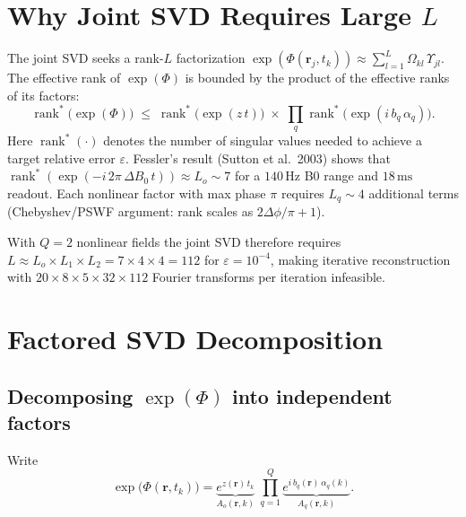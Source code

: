\documentclass{article}
\begin{document}
\section{Why Joint SVD Requires Large $L$}

The joint SVD seeks a rank-$L$ factorization
$\exp(\Phi(\mathbf{r}_j, t_k)) \approx \sum_{l=1}^L \Omega_{kl}\,\Upsilon_{jl}$.
The effective rank of $\exp(\Phi)$ is bounded by the product of the effective ranks
of its factors:
\begin{equation}
    \operatorname{rank}^*\bigl(\exp(\Phi)\bigr)
    \;\leq\; \operatorname{rank}^*\bigl(\exp(z\,t)\bigr) \;\times\;
    \prod_q \operatorname{rank}^*\bigl(\exp(i\,b_q\,\alpha_q)\bigr).
\end{equation}
Here $\operatorname{rank}^*(\cdot)$ denotes the number of singular values needed
to achieve a target relative error $\varepsilon$.
Fessler's result (Sutton et al.\ 2003) shows that $\operatorname{rank}^*(\exp(-i\,2\pi\,\Delta B_0\,t)) \approx L_o \sim 7$
for a $140\,\text{Hz}$ B0 range and $18\,\text{ms}$ readout.
Each nonlinear factor with max phase $\pi$ requires $L_q \sim 4$ additional terms
(Chebyshev/PSWF argument: rank scales as $2\Delta\phi/\pi + 1$).

With $Q=2$ nonlinear fields the joint SVD therefore requires
$L \approx L_o \times L_1 \times L_2 = 7 \times 4 \times 4 = 112$ for
$\varepsilon = 10^{-4}$, making iterative reconstruction with $20 \times 8 \times 5 \times 32 \times 112$
Fourier transforms per iteration infeasible.

\section{Factored SVD Decomposition}

\subsection{Decomposing $\exp(\Phi)$ into independent factors}

Write
\begin{equation}
    \exp\bigl(\Phi(\mathbf{r}, t_k)\bigr)
    = \underbrace{e^{z(\mathbf{r})\,t_k}}_{\displaystyle A_o(\mathbf{r},k)}
    \;\prod_{q=1}^Q
    \underbrace{e^{i\,b_q(\mathbf{r})\,\alpha_q(k)}}_{\displaystyle A_q(\mathbf{r},k)}.
    \label{eq:phi_factored}
\end{equation}
\end{document}
